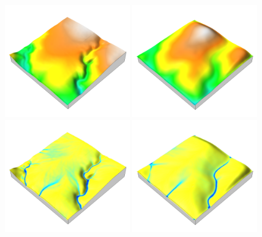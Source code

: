\documentclass[prodmode,acmtochi]{acmsmall} %
\begin{document}
\begin{figure}[h!]
\begin{center}
		\includegraphics[width=0.48\textwidth]{images/render_3d/dem_5.png}
		\includegraphics[width=0.48\textwidth]{images/render_3d/mean_dem_5.png}
		\includegraphics[width=0.48\textwidth]{images/render_3d/depth_5.png}
		\includegraphics[width=0.48\textwidth]{images/render_3d/mean_depth_5.png}

\end{center}
\end{figure}
\end{document}
